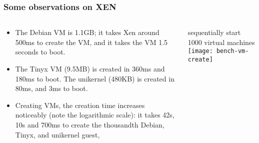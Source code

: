 \begin{frame}[plain]
	\frametitle{Some observations on XEN }
	
	
	
	\begin{columns}
		
		\begin{column}{.4\textwidth}

\begin{itemize}			
\item The Debian VM is 1.1GB; 
it takes Xen around 500ms
to create the VM, and
it takes the VM 1.5 seconds to boot. 

\item The Tinyx VM (9.5MB) is created in 360ms and  180ms to boot.
The unikernel (480KB) is created in 80ms, and
3ms to boot.

\item  Creating VMs, the creation time
increases noticeably (note the logarithmic scale): it takes 42s, 10s and 700ms to create the thousandth Debian, Tinyx, and unikernel guest,

\end{itemize}
			
		\end{column}
		
		\begin{column}{.6\textwidth}
			
			\small sequentially start 1000 virtual machines 
			\texttt{[image: bench-vm-create]}
		\end{column}
		
		
	\end{columns}
	
	
\end{frame}



